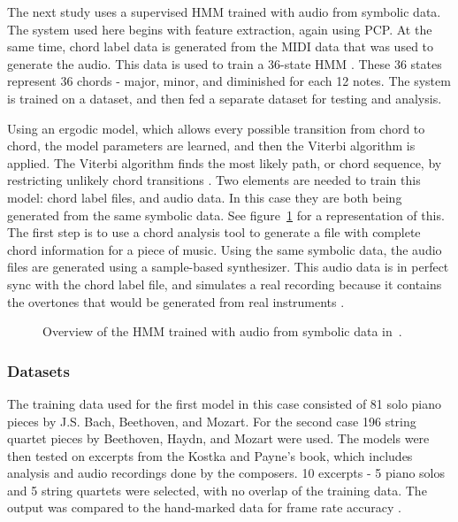 \documentclass{sig-alternate}
\begin{document}
The next study \cite{Lee:2006} uses a supervised HMM trained with audio from symbolic data. The system used here begins with feature extraction, again using PCP. At the same time, chord label data is generated from the MIDI data that was used to generate the audio. This data is used to train a 36-state HMM \cite{Lee:2006}. These 36 states represent 36 chords - major, minor, and diminished for each 12 notes. The system is trained on a dataset, and then fed a separate dataset for testing and analysis.


Using an ergodic model, which allows every possible transition from chord to chord, the model parameters are learned, and then the Viterbi algorithm is applied. The Viterbi algorithm finds the most likely path, or chord sequence, by restricting unlikely chord transitions \cite{TaeMin:2014}. Two elements are needed to train this model: chord label files, and audio data. In this case they are both being generated from the same symbolic data. See figure~\ref{fig:fig1} for a representation of this. The first step is to use a chord analysis tool to generate a file with complete chord information for a piece of music. Using the same symbolic data, the audio files are generated using a sample-based synthesizer. This audio data is in perfect sync with the chord label file, and simulates a real recording because it contains the overtones that would be generated from real instruments \cite{Lee:2006}.


\begin{figure}
\centering
{}
\caption{Overview of the HMM trained with audio from symbolic data in~\cite{Lee:2006}.}
\label{fig:fig1}
\end{figure}

\subsubsection{Datasets}

The training data used for the first model in this case consisted of 81 solo piano pieces by J.S. Bach, Beethoven, and Mozart. For the second case 196 string quartet pieces by Beethoven, Haydn, and Mozart were used. The models were then tested on excerpts from the Kostka and Payne's book, which includes analysis and audio recordings done by the composers. 10 excerpts - 5 piano solos and 5 string quartets were selected, with no overlap of the training data. The output was compared to the hand-marked data for frame rate accuracy \cite{Lee:2006}. 
\end{document}
